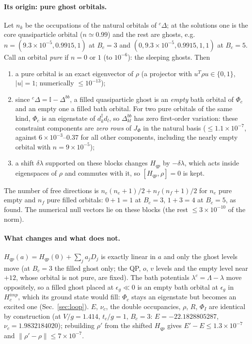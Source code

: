 \documentclass[11pt]{article}
\newcommand{\dg}{^{\dagger}}
\begin{document}
\paragraph{Its origin: pure ghost orbitals.} Let $n_k$ be the occupations of the natural orbitals of ${}^c\Delta$; at the solutions one is the core quasiparticle orbital ($n\simeq0.99$) and the rest are ghosts, e.g.\ $n=(9.3\times10^{-5},0.9915,1)$ at $B_c=3$ and $(0,9.3\times10^{-5},0.9915,1,1)$ at $B_c=5$.
Call an orbital \emph{pure} if $n=0$ or $1$ (to $10^{-6}$): the sleeping ghosts. Then
\begin{enumerate}
\item a pure orbital is an exact eigenvector of $\rho$ (a projector with $u^T\rho u\in\{0,1\}$, $|u|=1$; numerically $\le10^{-13}$);
\item since ${}^c\Delta=\mathbb I-\Delta^{bb}$, a filled quasiparticle ghost is an \emph{empty} bath orbital of $\Phi_c$ and an empty one a filled bath orbital. For two pure orbitals of the same kind, $\Phi_c$ is an eigenstate of $d\dg_kd_l$, so $\Delta^{bb}_{kl}$ has zero first-order variation: these constraint components are \emph{zero rows} of $J_\Phi$ in the natural basis
($\le1.1\times10^{-7}$, against $6\times10^{-3}$--$0.37$ for all other components, including the nearly empty orbital with $n=9\times10^{-5}$);
\item a shift $\delta\lambda$ supported on these blocks changes $H_{qp}$ by $-\delta\lambda$, which acts inside eigenspaces of $\rho$ and commutes with it, so $[H_{qp},\rho]=0$ is kept.
\end{enumerate}
The number of free directions is $n_e(n_e+1)/2+n_f(n_f+1)/2$ for $n_e$ pure empty and $n_f$ pure filled orbitals: $0+1=1$ at $B_c=3$, $1+3=4$ at $B_c=5$, as found. The numerical null vectors lie on these blocks (the rest $\le3\times10^{-10}$ of the norm).

\paragraph{What changes and what does not.} $H_{qp}(a)=H_{qp}(0)+\sum_ja_jD_j$ is exactly linear in $a$ and only the ghost levels move (at $B_c=3$ the filled ghost only; the QP, $o$, $v$ levels and the empty level near $+12$, whose orbital is not pure, are fixed). The bath potentials $\lambda^c=\Lambda-\lambda$ move oppositely, so a filled ghost placed at $\epsilon_g\ll0$ is an empty bath orbital at $\epsilon_g$ in $H^{imp}_c$, which its ground state would fill: $\Phi_c$ stays an eigenstate but becomes an excited one (Sec.~\ref{sec:loop}).
$E$, $\nu_c$, the double occupancies, $\rho$, $R$, $\Phi_I$ are identical by construction (at $V/g=1.414$, $t_c/g=1$, $B_c=3$: $E=-22.1828805287$, $\nu_c=1.9832184020$); rebuilding $\rho'$ from the shifted $H_{qp}$ gives $E'-E\le1.3\times10^{-7}$ and $\|\rho'-\rho\|\le7\times10^{-7}$.
\end{document}

